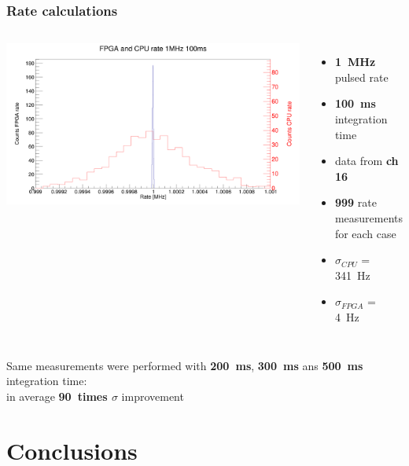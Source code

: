 \documentclass[aspectratio=169]{beamer}
\begin{document}
	\begin{frame}
		\frametitle{Rate calculations}
		\begin{columns}
			\begin{center}
				\includegraphics[width=1.0 \textwidth]{IMG2/FPGA_and_CPU_rate_1MHz_100ms}
			\end{center}
			\begin{itemize}
				\item \textbf{1~MHz} pulsed rate
				\item \textbf{100~ms} integration time
				\item data from \textbf{ch 16}
				\item \textbf{999} rate measurements for each case 
				\item $\sigma_{CPU}$ = {\color{red}341~Hz} 
				\item $\sigma_{FPGA}$ = {\color{blue}4~Hz}
			\end{itemize}
		\end{columns}
		{\color{blue} Same measurements were performed with \textbf{200~ms}, \textbf{300~ms} ans \textbf{500~ms} integration time:\\in average \textbf{90~times $\sigma$} improvement}
	\end{frame}

	\section{Conclusions}
	
\end{document}
